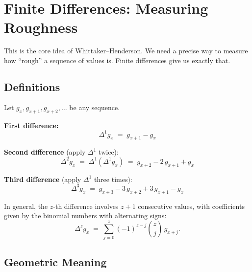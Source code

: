 \documentclass[11pt,a4paper]{article}
\begin{document}
\section{Finite Differences: Measuring Roughness}

This is the core idea of Whittaker--Henderson.  We need a precise way to measure how ``rough'' a sequence of values is.  Finite differences give us exactly that.

\subsection{Definitions}

\begin{formaldef}
Let $g_x, g_{x+1}, g_{x+2}, \ldots$ be any sequence.

\textbf{First difference:}
\[
  \Delta^1 g_x \;=\; g_{x+1} - g_x
\]

\textbf{Second difference} (apply $\Delta^1$ twice):
\[
  \Delta^2 g_x \;=\; \Delta^1(\Delta^1 g_x)
  \;=\; g_{x+2} - 2\,g_{x+1} + g_x
\]

\textbf{Third difference} (apply $\Delta^1$ three times):
\[
  \Delta^3 g_x \;=\; g_{x+3} - 3\,g_{x+2} + 3\,g_{x+1} - g_x
\]

In general, the $z$-th difference involves $z+1$ consecutive values, with coefficients given by the binomial numbers with alternating signs:
\[
  \Delta^z g_x \;=\; \sum_{j=0}^{z} (-1)^{z-j} \binom{z}{j}\, g_{x+j}.
\]
\end{formaldef}

\subsection{Geometric Meaning}
\end{document}
